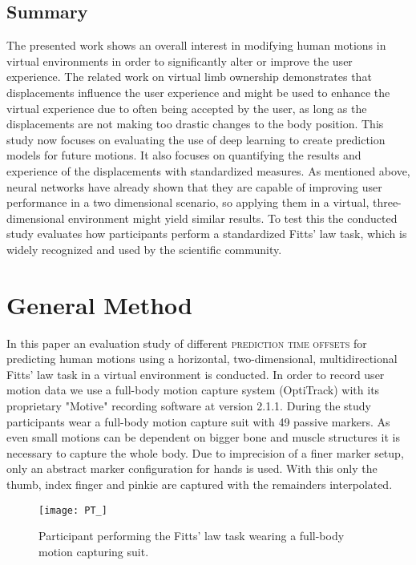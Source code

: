 \documentclass[sigconf]{acmart}
\begin{document}
\subsection{Summary}
The presented work shows an overall interest in modifying human motions in virtual environments in order to significantly alter or improve the user experience. 
The related work on virtual limb ownership demonstrates that displacements influence the user experience and might be used to enhance the virtual experience due to often being accepted by the user, as long as the displacements are not making too drastic changes to the body position. 
This study now focuses on evaluating the use of deep learning to create prediction models for future motions. It also focuses on quantifying the results and experience of the displacements with standardized measures. 
As mentioned above, neural networks have already shown that they are capable of improving user performance in a two dimensional scenario, so applying them in a virtual, three-dimensional environment might yield similar results.
To test this the conducted study evaluates how participants perform a standardized Fitts' law task, which is widely recognized and used by the scientific community.

\section{General Method}\label{section:General_Method}
In this paper an evaluation study of different \textsc{prediction time offsets} for predicting human motions using a horizontal, two-dimensional, multidirectional Fitts' law task in a virtual environment is conducted.
In order to record user motion data we use a full-body motion capture system (OptiTrack) with its proprietary "Motive" recording software at version 2.1.1.
During the study participants wear a full-body motion capture suit with 49 passive markers.
As even small motions can be dependent on bigger bone and muscle structures it is necessary to capture the whole body.
Due to imprecision of a finer marker setup, only an abstract marker configuration for hands is used. With this only the thumb, index finger and pinkie are captured with the remainders interpolated.

\begin{figure}[H]
  \centering
  \texttt{[image: PT\_]}
  \caption{Participant performing the Fitts' law task wearing a full-body motion capturing suit.}
  \label{fig:PT_}
\end{figure}
\end{document}
